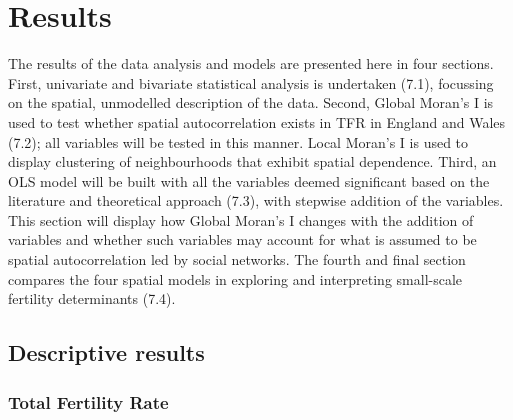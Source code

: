 \documentclass[12pt,twoside]{reedthesis}
\begin{document}
\hypertarget{results}{%
\chapter{Results}\label{results}}

The results of the data analysis and models are presented here in four sections. First, univariate and bivariate statistical analysis is undertaken (7.1), focussing on the spatial, unmodelled description of the data. Second, Global Moran's I is used to test whether spatial autocorrelation exists in TFR in England and Wales (7.2); all variables will be tested in this manner. Local Moran's I is used to display clustering of neighbourhoods that exhibit spatial dependence. Third, an OLS model will be built with all the variables deemed significant based on the literature and theoretical approach (7.3), with stepwise addition of the variables. This section will display how Global Moran's I changes with the addition of variables and whether such variables may account for what is assumed to be spatial autocorrelation led by social networks. The fourth and final section compares the four spatial models in exploring and interpreting small-scale fertility determinants (7.4).

\hypertarget{descriptive-results}{%
\section{Descriptive results}\label{descriptive-results}}

\hypertarget{total-fertility-rate}{%
\subsection{Total Fertility Rate}\label{total-fertility-rate}}
\end{document}
